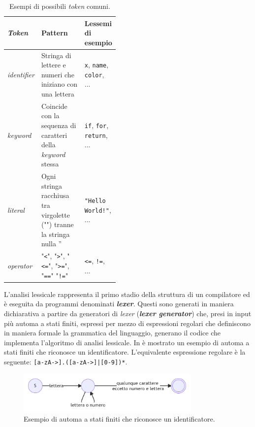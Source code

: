 \begin{table}[h]
    \centering
    \begin{tabular}{|p{0.15\linewidth}|p{0,45\linewidth}|p{0.3\linewidth}|}
        \hline
        \textbf{\textit{Token}} & \textbf{Pattern} & \textbf{Lessemi di esempio} \\ [0.5ex] 
        \hline\hline
        \textit{identifier} & Stringa di lettere e numeri che iniziano con una lettera & \texttt{x}, \texttt{name}, \texttt{color}, ... \\ 
        \hline
        \textit{keyword} & Coincide con la sequenza di caratteri della \textit{keyword} stessa & \texttt{if}, \texttt{for}, \texttt{return}, ... \\
        \hline
        \textit{literal} & Ogni stringa racchiusa tra virgolette ("") tranne la stringa nulla '' & \texttt{"Hello World!"}, ... \\
        \hline
        \textit{operator} & "\texttt{<}", "\texttt{>}", "\texttt{<=}", "\texttt{>=}", "\texttt{==}" "\texttt{!=}" & \texttt{<=}, \texttt{!=}, ... \\
        \hline
    \end{tabular}
    \caption{Esempi di possibili \textit{token} comuni.}
    \label{table:token-examples}
\end{table}

L'analisi lessicale rappresenta il primo stadio della struttura di un compilatore ed è eseguita da programmi denominati \textbf{\textit{lexer}}. 
%
Questi sono generati in maniera dichiarativa a partire da generatori di \textit{lexer} (\textbf{\textit{lexer generator}}) che, presi in input più automa a stati finiti, espressi per mezzo di espressioni regolari che definiscono in maniera formale la grammatica del linguaggio, generano il codice che implementa l'algoritmo di analisi lessicale. 
%
In  è mostrato un esempio di automa a stati finiti che riconosce un identificatore.
%
L'equivalente espressione regolare è la seguente: \texttt{[a-zA->].([a-zA->]|[0-9])*}.

\begin{figure}[h]
    \centering
    \includegraphics[width=0.8\textwidth]{resources/img/01-id-finite-automa.pdf}
    \caption{Esempio di automa a stati finiti che riconosce un identificatore.}
    \label{img:01-id-finite-automa}
\end{figure}

